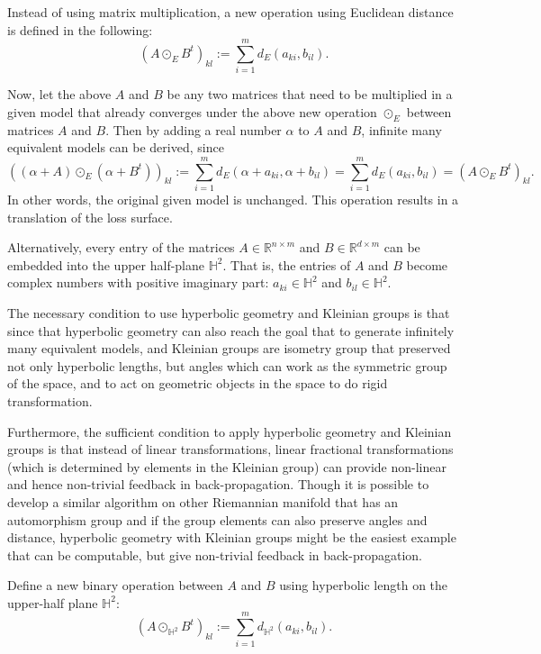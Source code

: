 \documentclass{article}
\theoremstyle{plain}
\theoremstyle{plain} %
\theoremstyle{definition}  %
\theoremstyle{remark}  %
\theoremstyle{plain}
\begin{document}
Instead of using matrix multiplication, a new operation using Euclidean distance is defined in the following:
$$
\left( A\odot_{E} B^t \right)_{kl}:= \sum\limits_{i=1}^m d_{E} \left( a_{ki} , b_{il} \right).
$$

Now, let the above $A$ and $B$ be any two matrices that need to be multiplied in a given model that already converges under the above new operation $\odot_{E}$ between matrices $A$ and $B$. Then by adding a real number $\alpha$ to $A$ and $B$, infinite many equivalent models can be derived, since
$$
\left( \left( \alpha + A \right) \odot_{E}\left( \alpha+ B^t \right)\right)_{kl} := \sum\limits_{i=1}^m d_{E} \left(\alpha + a_{ki} ,\alpha + b_{il} \right) = \sum\limits_{i=1}^m d_{E} \left( a_{ki} ,  b_{il} \right) = \left( A\odot_{E} B^t\right)_{kl}.
$$
In other words, the original given model is unchanged. This operation results in a translation of the loss surface. 

Alternatively, every entry of the matrices $A\in\mathbb{R}^{n\times m}$ and $B \in\mathbb{R}^{d\times m}$ can be embedded into the upper half-plane $\mathbb{H}^2$. That is, the entries of $A$ and $B$ become complex numbers with positive imaginary part: $a_{ki}\in\mathbb{H}^2$ and $b_{il}\in\mathbb{H}^2$.

The necessary condition to use hyperbolic geometry and Kleinian groups is that since that hyperbolic geometry can also reach the goal that to generate infinitely many equivalent models, and Kleinian groups are isometry group that preserved not only hyperbolic lengths, but angles which can work as the symmetric group of the space, and to act on geometric objects in the space to do rigid transformation.

Furthermore, the sufficient condition to apply hyperbolic geometry and Kleinian groups is that instead of linear transformations, linear fractional transformations (which is determined by elements in the Kleinian group) can provide non-linear and hence non-trivial feedback in back-propagation. Though it is possible to develop a similar algorithm on other Riemannian manifold that has an automorphism group and if the group elements can also preserve angles and distance, hyperbolic geometry with Kleinian groups might be the easiest example that can be computable, but give non-trivial feedback in back-propagation.


Define a new binary operation between $A$ and $B$ using hyperbolic length on the upper-half plane $\mathbb{H}^2$\cite{beardon2012geometry}:
$$
\left( A\odot_{\mathbb{H}^2} B^t \right)_{kl} :=\sum\limits_{i=1}^m d_{\mathbb{H}^2} \left( a_{ki} , b_{il} \right).
$$
\end{document}
